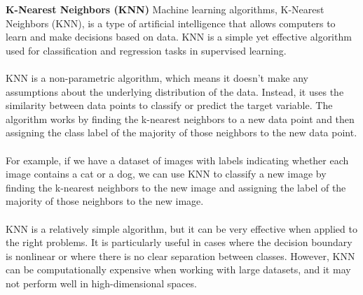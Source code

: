     \textbf{K-Nearest Neighbors (KNN)} \label{sec:knn}
    Machine learning algorithms, K-Nearest Neighbors (KNN), is a type of artificial intelligence that allows computers to learn and make
    decisions based on data. KNN is a simple yet effective algorithm used for classification and regression tasks in supervised learning.\\
    \\
    KNN is a non-parametric algorithm, which means it doesn't make any assumptions about the underlying distribution of the data.
    Instead, it uses the similarity between data points to classify or predict the target variable. The algorithm works by
    finding the k-nearest neighbors to a new data point and then assigning the class label of the majority of those neighbors to the new data point.\\
    \\
    For example, if we have a dataset of images with labels indicating whether each image contains a cat or a dog, we can use
    KNN to classify a new image by finding the k-nearest neighbors to the new image and assigning the label of the majority of those neighbors to the new image.\\
    \\
    KNN is a relatively simple algorithm, but it can be very effective when applied to the right problems.
    It is particularly useful in cases where the decision boundary is nonlinear or where there is no clear separation between classes.
    However, KNN can be computationally expensive when working with large datasets, and it may not perform well in high-dimensional spaces.

